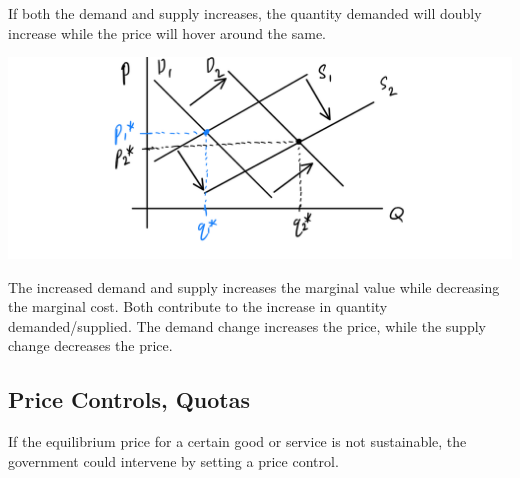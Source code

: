 \documentclass{article}
\begin{document}
    \begin{example}
      If both the demand and supply increases, the quantity demanded will doubly increase while the price will hover around the same.
      \begin{center}
        \includegraphics[scale=0.25]{img/Demand_I_Supply_I.PNG}
      \end{center}
      The increased demand and supply increases the marginal value while decreasing the marginal cost. Both contribute to the increase in quantity demanded/supplied. The demand change increases the price, while the supply change decreases the price. 
    \end{example}

  \subsection{Price Controls, Quotas}

    If the equilibrium price for a certain good or service is not sustainable, the government could intervene by setting a price control.
\end{document}
